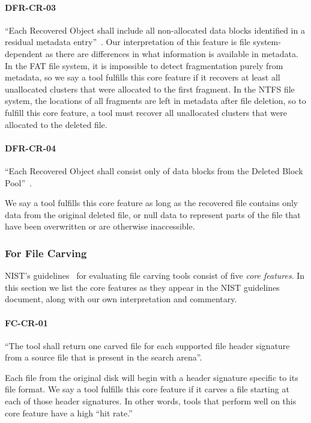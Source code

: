  \paragraph{DFR-CR-03} ``Each Recovered Object shall include all non-allocated data blocks identified in a residual metadata entry''~\cite{meta:dfr:standards}.
 Our interpretation of this feature is file system-dependent as there are differences in what information is available in metadata.
 In the FAT file system, it is impossible to detect fragmentation purely from metadata, so we say a tool fulfills this core feature if it recovers at least all unallocated clusters that were allocated to the first fragment.
 In the NTFS file system, the locations of all fragments are left in metadata after file deletion, so to fulfill this core feature, a tool must recover all unallocated clusters that were allocated to the deleted file.


 \paragraph{DFR-CR-04} ``Each Recovered Object shall consist only of data blocks from the Deleted Block Pool''~\cite{meta:dfr:standards}.
 
 We say a tool fulfills this core feature as long as the recovered file contains only data from the original deleted file, or null data to represent parts of the file that have been overwritten or are otherwise inaccessible.

\subsubsection{For File Carving} \label{sec:carving_features}

NIST's guidelines~\cite{carving_standards} for evaluating file carving tools consist of five \emph{core features}.
In this section we list the core features as they appear in the NIST guidelines document, along with our own interpretation and commentary.

 \paragraph{FC-CR-01} ``The tool shall return one carved file for each supported file header signature from a source file that is present in the search arena''.~\cite{carving_standards}
 
 Each file from the original disk will begin with a header signature specific to its file format. We say a tool fulfills this core feature if it carves a file starting at each of those header signatures.
 In other words, tools that perform well on this core feature have a high ``hit rate.''
 
